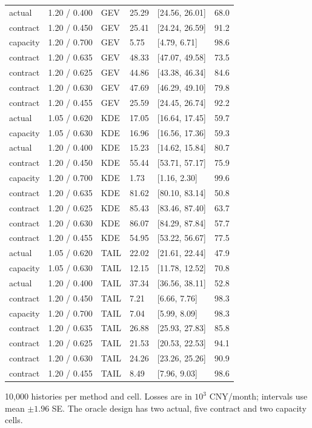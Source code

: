 \begin{longtable}{@{}llllll@{}}
actual & 1.20 / 0.400 & GEV & 25.29 & [24.56, 26.01] & 68.0\\
contract & 1.20 / 0.450 & GEV & 25.41 & [24.24, 26.59] & 91.2\\
capacity & 1.20 / 0.700 & GEV & 5.75 & [4.79, 6.71] & 98.6\\
contract & 1.20 / 0.635 & GEV & 48.33 & [47.07, 49.58] & 73.5\\
contract & 1.20 / 0.625 & GEV & 44.86 & [43.38, 46.34] & 84.6\\
contract & 1.20 / 0.630 & GEV & 47.69 & [46.29, 49.10] & 79.8\\
contract & 1.20 / 0.455 & GEV & 25.59 & [24.45, 26.74] & 92.2\\
actual & 1.05 / 0.620 & KDE & 17.05 & [16.64, 17.45] & 59.7\\
capacity & 1.05 / 0.630 & KDE & 16.96 & [16.56, 17.36] & 59.3\\
actual & 1.20 / 0.400 & KDE & 15.23 & [14.62, 15.84] & 80.7\\
contract & 1.20 / 0.450 & KDE & 55.44 & [53.71, 57.17] & 75.9\\
capacity & 1.20 / 0.700 & KDE & 1.73 & [1.16, 2.30] & 99.6\\
contract & 1.20 / 0.635 & KDE & 81.62 & [80.10, 83.14] & 50.8\\
contract & 1.20 / 0.625 & KDE & 85.43 & [83.46, 87.40] & 63.7\\
contract & 1.20 / 0.630 & KDE & 86.07 & [84.29, 87.84] & 57.7\\
contract & 1.20 / 0.455 & KDE & 54.95 & [53.22, 56.67] & 77.5\\
actual & 1.05 / 0.620 & TAIL & 22.02 & [21.61, 22.44] & 47.9\\
capacity & 1.05 / 0.630 & TAIL & 12.15 & [11.78, 12.52] & 70.8\\
actual & 1.20 / 0.400 & TAIL & 37.34 & [36.56, 38.11] & 52.8\\
contract & 1.20 / 0.450 & TAIL & 7.21 & [6.66, 7.76] & 98.3\\
capacity & 1.20 / 0.700 & TAIL & 7.04 & [5.99, 8.09] & 98.3\\
contract & 1.20 / 0.635 & TAIL & 26.88 & [25.93, 27.83] & 85.8\\
contract & 1.20 / 0.625 & TAIL & 21.53 & [20.53, 22.53] & 94.1\\
contract & 1.20 / 0.630 & TAIL & 24.26 & [23.26, 25.26] & 90.9\\
contract & 1.20 / 0.455 & TAIL & 8.49 & [7.96, 9.03] & 98.6\\
\bottomrule
\end{longtable}
\noindent\footnotesize 10,000 histories per method and cell. Losses are in $10^3$ CNY/month; intervals use mean $\pm1.96$ SE. The oracle design has two actual, five contract and two capacity cells.
\endgroup
